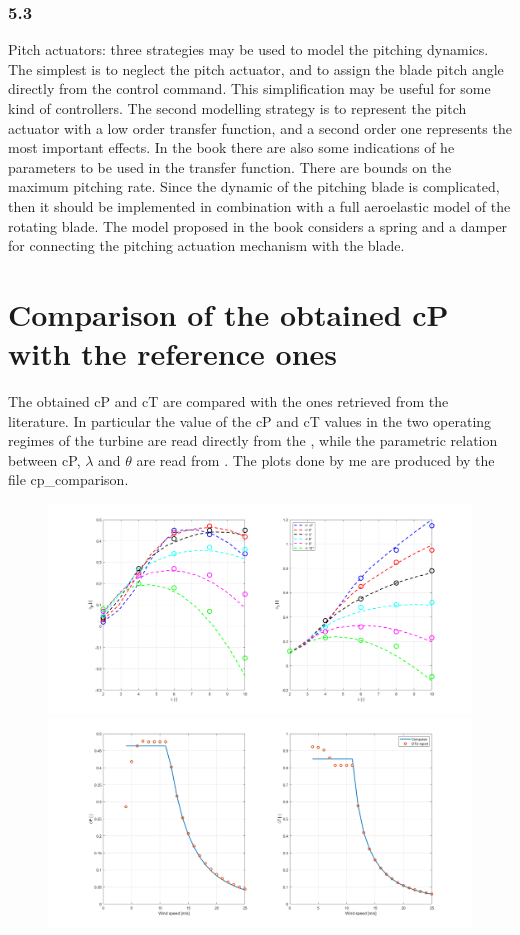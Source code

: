 \documentclass[]{article}
\begin{document}
\subsubsection{5.3}
Pitch actuators: three strategies may be used to model the pitching dynamics. The simplest is to neglect the pitch actuator, and to assign the blade pitch angle directly from the control command. This simplification may be useful for some kind of controllers. The second modelling strategy is to represent the pitch actuator with a low order transfer function, and a second order one represents the most important effects. In the book there are also some indications of he parameters to be used in the transfer function. There are bounds on the maximum pitching rate. Since the dynamic of the pitching blade is complicated, then it should be implemented in combination with a full aeroelastic model of the rotating blade. The model proposed in the book considers a spring and a damper for connecting the pitching actuation mechanism with the blade.

\newpage
\section{Comparison of the obtained cP with the reference ones}
The obtained cP and cT are compared with the ones retrieved from the literature. In particular the value of the cP and cT values in the two operating regimes of the turbine are read directly from the \cite{DTU_Wind_Energy_Report-I-0092}, while the parametric relation between cP, $\lambda$ and $\theta$ are read from \cite{Variable-speed_Variable-pitch_control_for_a_wind_t}. The plots done by me are produced by the file cp\_comparison. 
\begin{figure}[H]
	\centering
	\includegraphics[width=0.7\linewidth]{images/cp_parametric_comp.png}
	\includegraphics[width=0.7\linewidth]{images/cp_DTU10MW_comp.png}
	\caption{}
	\label{fig:cpparametriccomp}
\end{figure}
\end{document}
